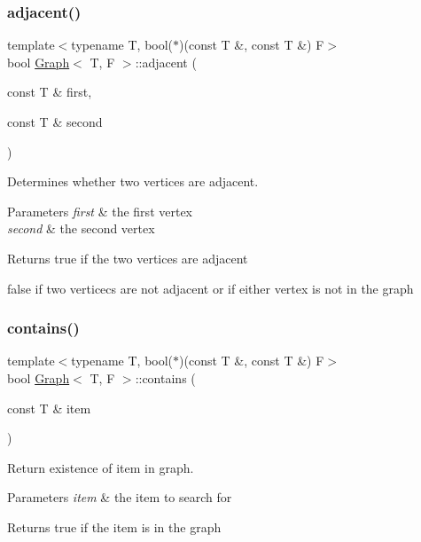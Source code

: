\subsubsection{\texorpdfstring{adjacent()}{adjacent()}}
{\footnotesize\ttfamily template$<$typename T, bool($\ast$)(const T \&, const T \&) F$>$ \\
bool \hyperlink{class_graph}{Graph}$<$ T, F $>$\+::adjacent (\begin{DoxyParamCaption}\item[{const T \&}]{first,  }\item[{const T \&}]{second }\end{DoxyParamCaption})}



Determines whether two vertices are adjacent. 


\begin{DoxyParams}{Parameters}
{\em first} & the first vertex \\
\hline
{\em second} & the second vertex \\
\hline
\end{DoxyParams}
\begin{DoxyReturn}{Returns}
true if the two vertices are adjacent 

false if two verticecs are not adjacent or if either vertex is not in the graph 
\end{DoxyReturn}
\mbox{\label{class_graph_a9e88e1fec0b85da66ea58a39a4fdc652}} 
\subsubsection{\texorpdfstring{contains()}{contains()}}
{\footnotesize\ttfamily template$<$typename T, bool($\ast$)(const T \&, const T \&) F$>$ \\
bool \hyperlink{class_graph}{Graph}$<$ T, F $>$\+::contains (\begin{DoxyParamCaption}\item[{const T \&}]{item }\end{DoxyParamCaption})}



Return existence of item in graph. 


\begin{DoxyParams}{Parameters}
{\em item} & the item to search for \\
\hline
\end{DoxyParams}
\begin{DoxyReturn}{Returns}
true if the item is in the graph 
\end{DoxyReturn}
\mbox{\label{class_graph_aaab69d9804f13918c7fe260b86a40d91}} 
